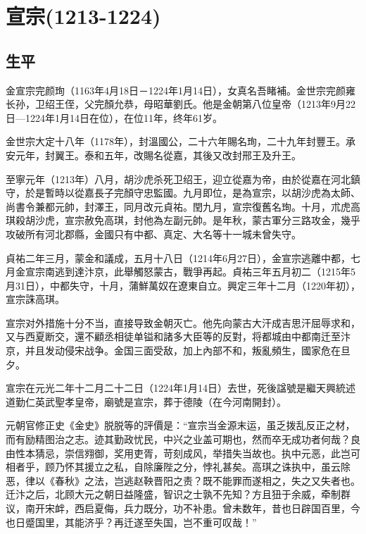 
\section{宣宗\tiny(1213-1224)}

\subsection{生平}

金宣宗完颜珣（1163年4月18日－1224年1月14日），女真名吾睹補。金世宗完颜雍长孙，卫绍王侄，父完顏允恭，母昭華劉氏。他是金朝第八位皇帝（1213年9月22日—1224年1月14日在位），在位11年，终年61岁。

金世宗大定十八年（1178年），封溫國公，二十六年賜名珣，二十九年封豐王。承安元年，封翼王。泰和五年，改賜名從嘉，其後又改封邢王及升王。

至寧元年（1213年）八月，胡沙虎杀死卫绍王，迎立從嘉为帝，由於從嘉在河北鎮守，於是暫時以從嘉長子完顏守忠監國。九月即位，是為宣宗，以胡沙虎為太師、尚書令兼都元帥，封澤王，同月改元貞祐。閏九月，宣宗復舊名珣。十月，朮虎高琪殺胡沙虎，宣宗赦免高琪，封他為左副元帥。是年秋，蒙古軍分三路攻金，幾乎攻破所有河北郡縣，金國只有中都、真定、大名等十一城未曾失守。

貞祐二年三月，蒙金和議成，五月十八日（1214年6月27日），金宣宗逃離中都，七月金宣宗南逃到達汴京，此舉觸怒蒙古，戰爭再起。貞祐三年五月初二（1215年5月31日），中都失守，十月，蒲鮮萬奴在遼東自立。興定三年十二月（1220年初），宣宗誅高琪。

宣宗对外措施十分不当，直接导致金朝灭亡。他先向蒙古大汗成吉思汗屈辱求和，又与西夏断交，還不顧丞相徒单镒和諸多大臣等的反對，将都城由中都南迁至汴京，并且发动侵宋战争。金国三面受敌，加上內部不和，叛亂頻生，國家危在旦夕。

宣宗在元光二年十二月二十二日（1224年1月14日）去世，死後諡號是繼天興統述道勤仁英武聖孝皇帝，廟號是宣宗，葬于德陵（在今河南開封）。

元朝官修正史《金史》脱脱等的評價是：“宣宗当金源末运，虽乏拨乱反正之材，而有励精图治之志。迹其勤政忧民，中兴之业盖可期也，然而卒无成功者何哉？良由性本猜忌，崇信翙御，奖用吏胥，苛刻成风，举措失当故也。执中元恶，此岂可相者乎，顾乃怀其援立之私，自除廉陛之分，悖礼甚矣。高琪之诛执中，虽云除恶，律以《春秋》之法，岂逃赵鞅晋阳之责？既不能罪而遂相之，失之又失者也。迁汴之后，北顾大元之朝日益隆盛，智识之士孰不先知？方且狃于余威，牵制群议，南开宋衅，西启夏侮，兵力既分，功不补患。曾未数年，昔也日辟国百里，今也日蹙国里，其能济乎？再迁遂至失国，岂不重可叹哉！”

